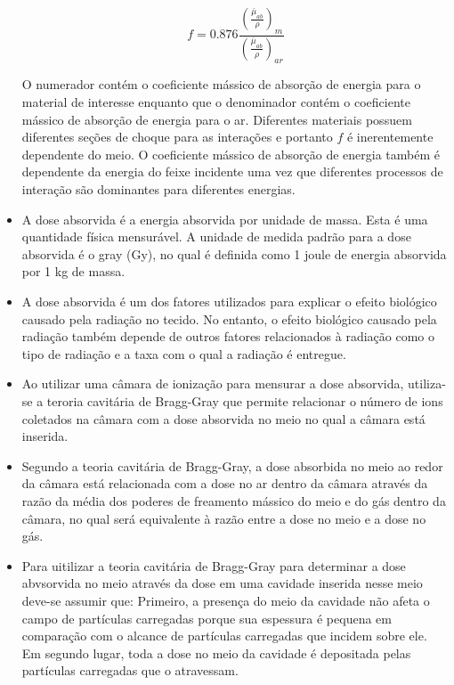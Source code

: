 \documentclass[11pt,a4paper]{article}
\newcounter{exemplo}
\begin{document}
\begin{exemplo}
\begin{itemize}
            $$f = 0.876 \frac{\left(\frac{\bar{\mu}_{ab}}{\rho}\right)_m}{\left(\frac{\bar{\mu}_{ab}}{\rho}\right)_{ar}}$$

        O numerador contém o coeficiente mássico de absorção de energia para o material de interesse enquanto que o denominador contém o coeficiente mássico de absorção de energia para o ar. Diferentes materiais possuem diferentes seções de choque para as interações e portanto $f$ é inerentemente dependente do meio. O coeficiente mássico de absorção de energia também é dependente da energia do feixe incidente uma vez que diferentes processos de interação são dominantes para diferentes energias. 

        \item A dose absorvida é a energia absorvida por unidade de massa. Esta é uma quantidade física mensurável. A unidade de medida padrão para a dose absorvida é o gray (Gy), no qual é definida como 1 joule de energia absorvida por 1 kg de massa.
        
        \item A dose absorvida é um dos fatores utilizados para explicar o efeito biológico causado pela radiação no tecido. No entanto, o efeito biológico causado pela radiação também depende de outros fatores relacionados à radiação como o tipo de radiação e a taxa com o qual a radiação é entregue.
        
        \item Ao utilizar uma câmara de ionização para mensurar a dose absorvida, utiliza-se a teroria cavitária de Bragg-Gray que permite relacionar o número de ions coletados na câmara com a dose absorvida no meio no qual a câmara está inserida. 
        
        \item Segundo a teoria cavitária de Bragg-Gray, a dose absorbida no meio ao redor da câmara está relacionada com a dose no ar dentro da câmara através da razão da média dos poderes de freamento mássico do meio e do gás dentro da câmara, no qual será equivalente à razão entre a dose no meio e a dose no gás.
        
        \item Para uitilizar a teoria cavitária de Bragg-Gray para determinar a dose abvsorvida no meio através da dose em uma cavidade inserida nesse meio deve-se assumir que: Primeiro, a presença do meio da cavidade não afeta o campo de partículas carregadas porque sua espessura é pequena em comparação com o alcance de partículas carregadas que incidem sobre ele. Em segundo lugar, toda a dose no meio da cavidade é depositada pelas partículas carregadas que o atravessam.
        

\end{itemize}
\end{exemplo}
\end{document}
